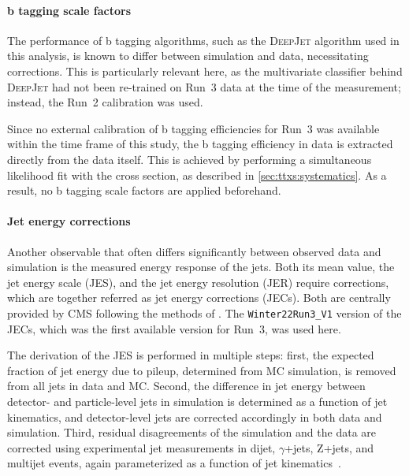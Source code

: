 
\paragraph{b tagging scale factors}

The performance of b tagging algorithms, such as the \textsc{DeepJet} algorithm used in this analysis, is known to differ between simulation and data, necessitating corrections. This is particularly relevant here, as the multivariate classifier behind \textsc{DeepJet} had not been re-trained on Run~3 data at the time of the measurement; instead, the Run~2 calibration was used. 

Since no external calibration of b tagging efficiencies for Run~3 was available within the time frame of this study, the b tagging efficiency in data is extracted directly from the data itself. This is achieved by performing a simultaneous likelihood fit with the \ttbar cross section, as described in \cref{sec:ttxs:systematics}. As a result, no b tagging scale factors are applied beforehand. 

\paragraph{Jet energy corrections}

Another observable that often differs significantly between observed data and simulation is the measured energy response of the jets. Both its mean value, the jet energy scale (JES), and the jet energy resolution (JER) require corrections, which are together referred as jet energy corrections (JECs). Both are centrally provided by CMS following the methods of . The \texttt{Winter22Run3\_V1} version of the JECs, which was the first available version for Run~3, was used here.

The derivation of the JES is performed in multiple steps:
first, the expected fraction of jet energy due to pileup, determined from MC simulation, is removed from all jets in data and MC. Second, the difference in jet energy between detector- and particle-level jets in simulation is determined as a function of jet kinematics, and detector-level jets are corrected accordingly in both data and simulation.
Third, residual disagreements of the simulation and the data are corrected using experimental jet measurements in dijet, $\gamma$+jets, Z+jets, and multijet events, again parameterized as a function of jet kinematics~\cite{CMS:JME-13-004}.

